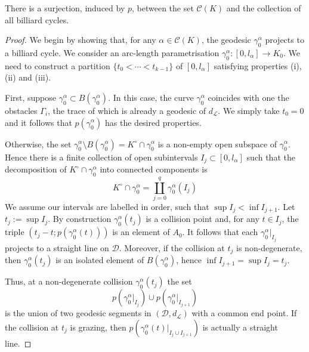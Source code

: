 \documentclass[reqno,11pt]{amsart}
\begin{document}
\begin{theorem}\label{thm:char_billiard_cycles_1}
    There is a surjection, induced by \( p \), between the set \( \mathcal{C}(K) \) and the collection of all billiard cycles.
\end{theorem}
\begin{proof}
    \par We begin by showing that, for any \( \alpha \in \mathcal{C}(K) \), the geodesic \( \gamma^\alpha_0 \) projects to a billiard cycle.
    We consider an arc-length parametrisation \( \gamma^\alpha_0\colon [0, l_\alpha] \to K_0 \).
    We need to construct a partition \( \{t_0 < \cdots < t_{k-1}\} \) of \( [0, l_\alpha] \) satisfying properties (i), (ii) and (iii).
    \par First, suppose \( \gamma^\alpha_0 \subset B(\gamma^\alpha_0) \).
    In this case, the curve \( \gamma^\alpha_0 \) coincides with one the obstacles \( \Gamma_i \), the trace of which is already a geodesic of \( d_\mathcal{L} \).
    We simply take \( t_0 = 0 \) and it follows that \( p(\gamma^\alpha_0) \) has the desired properties.
    \par Otherwise, the set \( \gamma^\alpha_0\setminus B(\gamma^\alpha_0) = K^\circ\cap\gamma^\alpha_0 \) is a non-empty open subspace of \( \gamma^\alpha_0\).
    Hence there is a finite collection of open subintervals \(I_j \subset [0, l_\alpha] \) such that the decomposition of  \( K^\circ\cap\gamma^\alpha_0 \) into connected components is
    \[
        K^\circ\cap\gamma^\alpha_0 = \coprod_{j=0}^{q}\gamma^\alpha_0(I_j)
    \]
    We assume our intervals are labelled in order, such that \( \sup I_j < \inf I_{j+1} \).
    Let \( t_j := \sup I_j \). 
    By construction \( \gamma^\alpha_0(t_j) \) is a collision point and, for any \( t \in I_j \), the triple \( (t_j-t; p(\gamma^\alpha_0(t))) \) is an element of \( A_0 \).
    It follows that each \( \gamma^\alpha_0\rvert_{I_j} \) projects to a straight line on \( \mathcal{D} \).
    Moreover, if the collision at \(t_j\) is non-degenerate, then \(\gamma^\alpha_0(t_j)\) is an isolated element of \(B(\gamma^\alpha_0)\), hence \(\inf I_{j+1} = \sup I_j = t_j\).
    \par Thus, at a non-degenerate collision \( \gamma^\alpha_0(t_j) \) the set
    \[
        p(\gamma^\alpha_0\rvert_{I_j})\cup p(\gamma^\alpha_0\rvert_{I_{j+1}})
    \]
    is the union of two geodesic segments in \( (\mathcal{D}, d_\mathcal{L}) \) with a common end point. If the collision at \(t_j\) is grazing, then \( p(\gamma^\alpha_0(t)\rvert_{I_j \cup I_{j+1}}) \) is actually a straight line. 

\end{proof}
\end{document}
